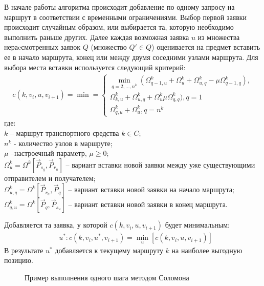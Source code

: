 \documentclass[]{TAACpaper}
\begin{document}
В начале работы алгоритма происходит добавление по одному запросу на маршрут в соответствии с временными ограничениями. Выбор первой заявки происходит случайным образом, или выбирается та, которую необходимо выполнить раньше других. Далее каждая возможная заявка  $u$ из множества нераcсмотренных заявок $Q$ (множество $Q' \in Q$) оценивается на предмет вставить ее в начало маршрута, конец или между двумя соседними узлами маршрута. Для выбора места вставки используется следующий критерий:
\begin{align} 
	\label{insert_kr}
	c(k,v_i,u,v_{i+1}) = \min =
	\begin{cases}
		\min_{q=2,\dots,n^k}(\Omega_{q-1,u}^k+\Omega_{u}^{k}+\Omega_{u,q}^{k}-\mu \Omega_{q-1,q}^k),\\
		\Omega_{k,u}^k+\Omega_{u,q}^k+\Omega_{u}^k\mu \Omega_{q,q}^k), q=1\\
		\Omega_{q,u}^k+\Omega_{u}^k, q=n^k
	\end{cases}
\end{align} 
где:\\
$k$ -- маршрут транспортного средства $k\in C$;\\
$n^k$ - количество узлов в маршруте;\\
$\mu$ --настроечный параметр, $\mu \ge 0 $;\\
$\Omega_{u}^k=\Omega^k[\vec{P}_{s_q}, \vec{P}_{r_u}]$ -- вариант вставки новой заявки между уже существующими отправителем и получателем;\\
$\Omega_{u,q}^k=\Omega^k[\vec{P}_{r_u}, \vec{P}_{q}]$ -- вариант вставки новой заявки на начало маршрута;\\
$\Omega_{q,u}^k=\Omega^k[\vec{P}_{q}, \vec{P}_{s_u}]$ -- вариант вставки новой заявки в конец маршрута.

Добавляется та заявка, у которой $c(k,v_i,u,v_{i+1})$ будет минимальным:
\begin{align} 
	\label{kriterij}
	& u^*:c(k,v_i,u^*,v_{i+1})=\min_{u}[c(k,v_i,u,v_{i+1})]
\end{align} 
В результате $u^*$ добавляется к текущему маршруту $k$ на наиболее выгодную позицию.
\begin{figure}[h]
	\caption{Пример выполнения одного шага методом Соломона}
	\label{ris:pict1}
\end{figure}
\end{document}
